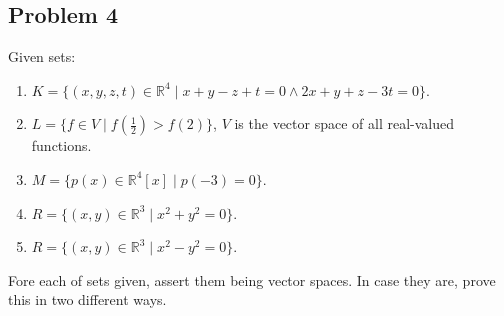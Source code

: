 \documentclass[11pt]{article}
\begin{document}
\subsection{Problem 4}
\label{sec-1-4}
Given sets:
\begin{enumerate}
\item $K = \{(x,y,z,t) \in \mathbb{R}^4\;|\; x+y-z+t=0 \land 2x+y+z-3t=0\}$.
\item $L = \{f \in V\;|\; f\left(\frac{1}{2}\right)>f(2)\}$, $V$ is the vector
space of all real-valued functions.
\item $M = \{p(x) \in \mathbb{R}^4[x]\;|\; p(-3) = 0\}$.
\item $R = \{(x,y) \in \mathbb{R}^3\;|\; x^2 + y^2 = 0\}$.
\item $R = \{(x,y) \in \mathbb{R}^3\;|\; x^2 - y^2 = 0\}$.
\end{enumerate}

Fore each of sets given, assert them being vector spaces.  In case they are,
prove this in two different ways.
\end{document}
